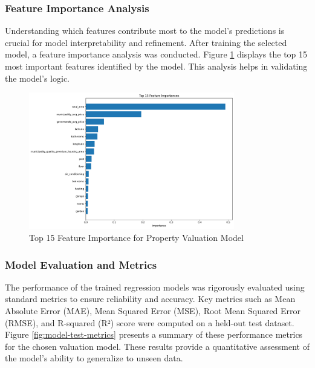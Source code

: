 \subsubsection{Feature Importance Analysis}
Understanding which features contribute most to the model's predictions is crucial for model interpretability and refinement. After training the selected model, a feature importance analysis was conducted. Figure \ref{fig:feature-importance} displays the top 15 most important features identified by the model. This analysis helps in validating the model's logic.
\newpage

\begin{figure}[htbp]
    \centering
    \includegraphics[width=0.8\textwidth]{images/top_15_feature_importance.png} %
    \caption{Top 15 Feature Importance for Property Valuation Model}
    \label{fig:feature-importance}
\end{figure}

\subsubsection{Model Evaluation and Metrics}
The performance of the trained regression models was rigorously evaluated using standard metrics to ensure reliability and accuracy. Key metrics such as Mean Absolute Error (MAE), Mean Squared Error (MSE), Root Mean Squared Error (RMSE), and R-squared (R²) score were computed on a held-out test dataset. Figure \ref{fig:model-test-metrics} presents a summary of these performance metrics for the chosen valuation model. These results provide a quantitative assessment of the model's ability to generalize to unseen data.


